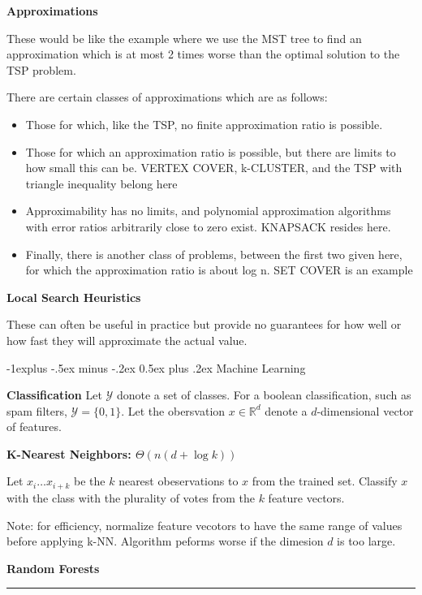 \documentclass[landscape]{article}
\makeatletter
\renewcommand{\subsection}{\@startsection{subsection}{2}{0mm}%
                            {-1explus -.5ex minus -.2ex}%
                            {0.5ex plus .2ex}%
                            {\normalfont\normalsize\bfseries}}
\makeatother
\begin{document}
\begin{multicols}{3}
\textbf{Approximations}


These would be like the example where we use the MST tree to find an approximation which is at most 2 times worse than the optimal solution to the TSP problem.

There are certain classes of approximations which are as follows:

\begin{itemize}
	\item Those for which, like the TSP, no finite approximation ratio is possible.
	\item Those for which an approximation ratio is possible, but there are limits to how small
this can be. VERTEX COVER, k-CLUSTER, and the TSP with triangle inequality belong here
	\item Approximability has no limits, and polynomial approximation algorithms with error ratios arbitrarily close to zero exist. KNAPSACK resides here.
	\item Finally, there is another class of problems, between the first two given here, for which
the approximation ratio is about log n. SET COVER is an example
\end{itemize}

\textbf{Local Search Heuristics}

These can often be useful in practice but provide no guarantees for how well or how fast they will approximate the actual value.


\subsection{Machine Learning}

\textbf{Classification}
Let $\mathcal{Y}$ donote a set of classes. For a boolean classification, such as spam filters, $\mathcal{Y} = \{0, 1\}$. Let the obersvation $x \in \mathbb{R}^d$ denote a $d$-dimensional vector of features.

\textbf{K-Nearest Neighbors: $\Theta(n(d + \log k))$}

Let $x_i \ldots x_{i+k}$ be the $k$ nearest obeservations to $x$ from the trained set. Classify $x$ with the class with the plurality of votes from the $k$ feature vectors.

Note: for efficiency, normalize feature vecotors to have the same range of values before applying k-NN. Algorithm peforms worse if the dimesion $d$ is too large.

\textbf{Random Forests}


\rule{0.3\linewidth}{0.25pt}
\newpage
\scriptsize


\end{multicols}
\end{document}
